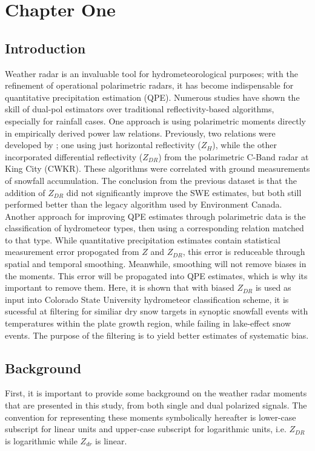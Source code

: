 \chapter{Chapter One}
\section{Introduction}
Weather radar is an invaluable tool for hydrometeorological purposes; with the
refinement of operational polarimetric radars, it has become indispensable for
quantitative precipitation estimation (QPE). Numerous studies have shown the skill of
dual-pol estimators over traditional reflectivity-based algorithms, especially for
rainfall cases. One approach is using polarimetric moments directly in empirically derived power law relations. Previously,
two relations were developed by \cite{Hassan2017} ; one using just horizontal
reflectivity ($Z_H$), while the other incorporated differential reflectivity ($Z_{DR}$)
from the polarimetric C-Band radar at King City (CWKR). These algorithms were correlated
with ground measurements of snowfall accumulation.  The conclusion from the previous
dataset is that the addition of $Z_{DR}$ did not significantly improve the SWE
estimates, but both still performed better than the legacy algorithm used by Environment
Canada. Another approach for improving QPE estimates through polarimetric data is the
classification of hydrometeor types, then using a corresponding relation matched to that
type. While quantitative precipitation estimates contain statistical measurement error
propogated from $Z$ and $Z_{DR}$, this error is reduceable through spatial and temporal
smoothing. Meanwhile, smoothing will not remove biases in the moments. This error will
be propagated into QPE estimates, which is why its important to remove them. Here, it is
shown that with biased $Z_{DR}$ is used as input into Colorado State University
hydrometeor classification scheme, it is sucessful at filtering for similiar dry snow
targets in synoptic snowfall events with temperatures within the plate growth region,
while failing in lake-effect snow events. The purpose of the filtering is to yield
better estimates of systematic bias.
\section{Background}
First, it is important to provide some background on the weather radar moments that are presented in this study, from both single and dual polarized signals. The convention for representing these moments symbolically hereafter is lower-case subscript for linear units and upper-case subscript for logarithmic units, i.e. $Z_{DR}$ is logarithmic while $Z_{dr}$ is linear.
